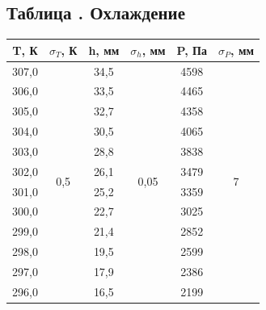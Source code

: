 \documentclass[15pt,a5paper,reqno]{article}
\begin{document}
    \subsection{Таблица . Охлаждение}
    \begin{tabular}{|c|c|c|c|c|c|}
        \hline
        T, К  &  $\sigma_T$, К        & h, мм & $\sigma_h$, мм         & P, Па & $\sigma_P$, мм      \\ \hline
        307,0 & \multirow{12}{*}{0,5} & 34,5  & \multirow{12}{*}{0,05} & 4598  & \multirow{12}{*}{7} \\ 
        306,0 &                       & 33,5  &                        & 4465  &                     \\ 
        305,0 &                       & 32,7  &                        & 4358  &                     \\ 
        304,0 &                       & 30,5  &                        & 4065  &                     \\ 
        303,0 &                       & 28,8  &                        & 3838  &                     \\ 
        302,0 &                       & 26,1  &                        & 3479  &                     \\ 
        301,0 &                       & 25,2  &                        & 3359  &                     \\ 
        300,0 &                       & 22,7  &                        & 3025  &                     \\         
        299,0 &                       & 21,4  &                        & 2852  &                     \\         
        298,0 &                       & 19,5  &                        & 2599  &                     \\        
        297,0 &                       & 17,9  &                        & 2386  &                     \\       
        296,0 &                       & 16,5  &                        & 2199  &                     \\ \hline
    \end{tabular}

    \newpage
\end{document}
